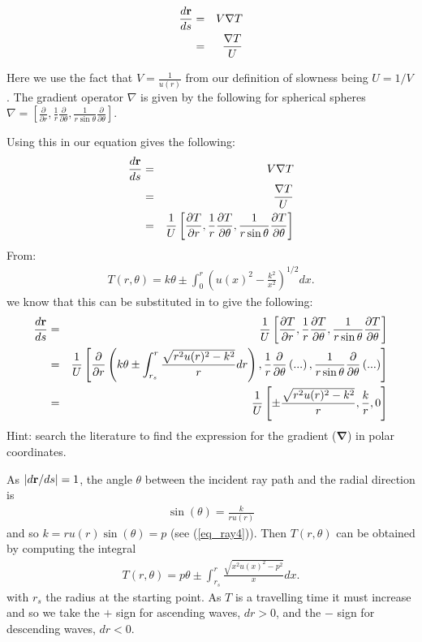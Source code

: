 \documentclass{mm2}
\newcommand{\bnabla}{\boldsymbol{\nabla}}
\begin{document}
\begin{answer}{4}

\begin{eqnarray}
\frac{d {\bf r}}{d s} &=&  V \nabla T\\ &=& \frac{\nabla T}{U}
\label{eq_drds} 
\end{eqnarray} 

Here we use the fact that $ V =  \frac{1}{u(r)}$ from our definition of slowness being $U = 1/V$.
The gradient operator $\nabla$ is given by the following for spherical spheres $\nabla = \left[ \frac{\partial}{\partial r}, \frac{1}{r}\frac{\partial}{\partial \theta}, \frac{1}{r\sin \theta}\frac{\partial}{\partial \theta} \right]$.

Using this in our equation gives the following:
\begin{eqnarray}
\frac{d {\bf r}}{d s} &=&  V \nabla T\\ &=& \frac{\nabla T}{U}\\ &=& \frac{1}{U}\left[\frac{\partial T}{\partial r}, \frac{1}{r}\frac{\partial T}{\partial \theta}, \frac{1}{r\sin \theta}\frac{\partial T}{\partial \theta}\right]
\label{eq_drds} 
\end{eqnarray}
From:
\begin{eqnarray}
T(r,\theta) = k\theta \pm \int_0^r \left(u(x)^2 -\frac{k^2}{x^2}\right)^{1/2} dx.
\label{eq_Tansatz2} 
\end{eqnarray}
we know that this can be substituted in to give the following:
\begin{eqnarray}
\frac{d {\bf r}}{d s} &=& \frac{1}{U}\left[\frac{\partial T}{\partial r}, \frac{1}{r}\frac{\partial T}{\partial \theta}, \frac{1}{r\sin \theta}\frac{\partial T}{\partial \theta}\right]\\
&=&  \frac{1}{U}\left[\frac{\partial}{\partial r} \left( k\theta \pm \int_{r_s}^r \frac{\sqrt{r^2 u(r)^2 -k^2}}{r} dr \right), \frac{1}{r}\frac{\partial}{\partial \theta}  \left( ... \right), \frac{1}{r\sin \theta}\frac{\partial}{\partial \theta} \left( ... \right)\right]\\ &=&  \frac{1}{U}\left[ \pm \frac{\sqrt{r^2 u(r)^2 -k^2}}{r}, \frac{k}{r}, 0\right]
\label{eq_drds} 
\end{eqnarray} 
Hint: search the literature to find the expression for the gradient 
($\bnabla$) in polar coordinates.
\end{answer}

As $|d {\bf r}/d s|=1$, the angle $\theta$ between the incident 
ray path and the radial direction is
\begin{eqnarray} 
\sin(\theta) = \frac{k}{r u(r)} 
\end{eqnarray}
and so $k=r u(r) \sin(\theta) = p$ (see (\ref{eq_ray4})). 
Then $T(r,\theta)$ can be obtained by computing the integral
\begin{eqnarray}
T(r,\theta) = p\theta \pm \int_{r_s}^r \frac{\sqrt{x^2 u(x)^2 -p^2}}{x} dx.
\label{eq_Ta} 
\end{eqnarray}
with $r_s$ the radius at the starting point. As $T$ is a travelling time it 
must increase and so we take the $+$ sign for ascending waves, $dr>0$, and
the $-$ sign for descending waves, $dr <0$. 
\end{document}
